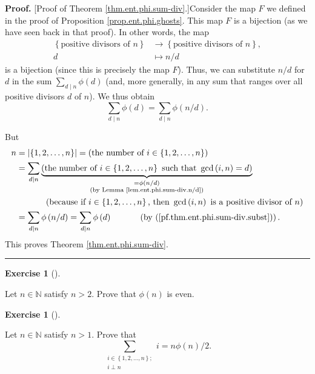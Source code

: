 \documentclass[numbers=enddot,12pt,final,onecolumn,notitlepage]{scrartcl}%
\newcounter{exer}
\numberwithin{exer}{subsection}
\theoremstyle{definition}
\newtheorem{exmp}[exer]{Exercise}
\newenvironment{exercise}[1][]
{\begin{exmp}[#1]\begin{leftbar}}
{\end{leftbar}\end{exmp}}
\newenvironment{proof}[1][Proof]{\noindent\textbf{#1.} }{\ \rule{0.5em}{0.5em}}
\let\sumnonlimits\sum
\renewcommand{\sum}{\sumnonlimits\limits}
\begin{document}
\begin{proof}
[Proof of Theorem \ref{thm.ent.phi.sum-div}.]Consider the map $F$ we defined
in the proof of Proposition \ref{prop.ent.phi.ghosts}. This map $F$ is a
bijection (as we have seen back in that proof). In other words, the map%
\begin{align*}
\left\{  \text{positive divisors of }n\right\}   &  \rightarrow\left\{
\text{positive divisors of }n\right\}  ,\\
d  &  \mapsto n/d
\end{align*}
is a bijection (since this is precisely the map $F$). Thus, we can substitute
$n/d$ for $d$ in the sum $\sum_{d\mid n}\phi\left(  d\right)  $ (and, more
generally, in any sum that ranges over all positive divisors $d$ of $n$). We
thus obtain%
\begin{equation}
\sum_{d\mid n}\phi\left(  d\right)  =\sum_{d\mid n}\phi\left(  n/d\right)  .
\label{pf.thm.ent.phi.sum-div.subst}%
\end{equation}


But%
\begin{align*}
n  &  =\left\vert \left\{  1,2,\ldots,n\right\}  \right\vert =\left(
\text{the number of }i\in\left\{  1,2,\ldots,n\right\}  \right) \\
&  =\sum_{d\mid n}\underbrace{\left(  \text{the number of }i\in\left\{
1,2,\ldots,n\right\}  \text{ such that }\gcd\left(  i,n\right)  =d\right)
}_{\substack{=\phi\left(  n/d\right)  \\\text{(by Lemma
\ref{lem.ent.phi.sum-div.n/d})}}}\\
&  \ \ \ \ \ \ \ \ \ \ \left(  \text{because if }i\in\left\{  1,2,\ldots
,n\right\}  \text{, then }\gcd\left(  i,n\right)  \text{ is a positive divisor
of }n\right) \\
&  =\sum_{d\mid n}\phi\left(  n/d\right)  =\sum_{d\mid n}\phi\left(  d\right)
\ \ \ \ \ \ \ \ \ \ \left(  \text{by (\ref{pf.thm.ent.phi.sum-div.subst}%
)}\right)  .
\end{align*}
This proves Theorem \ref{thm.ent.phi.sum-div}.
\end{proof}

\begin{exercise}
\label{exe.ent.phi.even}Let $n\in\mathbb{N}$ satisfy $n>2$. Prove that
$\phi\left(  n\right)  $ is even.
\end{exercise}

\begin{exercise}
\label{exe.ent.phi.gauss}Let $n\in\mathbb{N}$ satisfy $n>1$. Prove that
\[
\sum_{\substack{i\in\left\{  1,2,\ldots,n\right\}  ;\\i\perp n}}i=n\phi\left(
n\right)  /2.
\]

\end{exercise}
\end{document}
